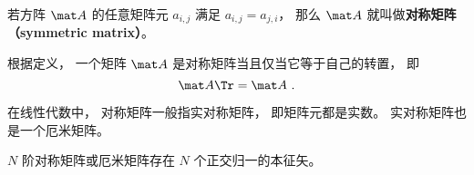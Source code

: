 
\begin{issues}
\issueDraft
{}
\end{issues}


\begin{definition}{}
若方阵 $\mat A$ 的任意矩阵元 $a_{i,j}$ 满足 $a_{i,j} = a_{j,i}$， 那么 $\mat A$ 就叫做\textbf{对称矩阵（symmetric matrix）}。
\end{definition}

根据定义， 一个矩阵 $\mat A$ 是对称矩阵当且仅当它等于自己的转置， 即
\begin{equation}
\mat A\Tr = \mat A~.
\end{equation}

在线性代数中， 对称矩阵一般指实对称矩阵， 即矩阵元都是实数。 实对称矩阵也是一个厄米矩阵。

$N$ 阶对称矩阵或厄米矩阵存在 $N$ 个正交归一的本征矢。
